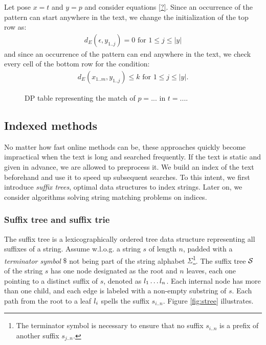 Let pose $x=t$ and $y=p$ and consider equations \ref{?}.
Since an occurrence of the pattern can start anywhere in the text, we change the initialization of the top row as:
\begin{eqnarray}
d_E(\epsilon, y_{1..j}) = 0 \text{ for } 1 \leq j \leq | y |
\end{eqnarray}
and since an occurrence of the pattern can end anywhere in the text, we check every cell of the bottom row for the condition:
\begin{eqnarray}
d_E(x_{1..m},y_{1..j}) \leq k \text{ for } 1 \leq j \leq | y |.
\end{eqnarray}

\begin{figure}[h]
\caption{DP table representing the match of $p=...$ in $t=...$.}
\label{fig:asm-dp}
\end{figure}





\subsection{Indexed methods}

No matter how fast online methods can be, these approaches quickly become impractical when the text is long and searched frequently.
If the text is static and given in advance, we are allowed to preprocess it.
We build an index of the text beforehand and use it to speed up subsequent searches.
To this intent, we first introduce \emph{suffix trees}, optimal data structures to index strings.
Later on, we consider algorithms solving string matching problems on indices.


\subsubsection{Suffix tree and suffix trie}

The suffix tree \citep{Morrison1968} is a lexicographically ordered tree data structure representing all suffixes of a string.
Assume w.l.o.g. a string $s$ of length $n$, padded with a \emph{terminator symbol} $\$$ not being part of the string alphabet $\Sigma$\footnote{The terminator symbol is necessary to ensure that no suffix $s_{i..n}$ is a prefix of another suffix $s_{j..n}$.}.
The suffix tree $\mathcal {S}$ of the string $s$ has one node designated as the root and $n$ leaves, each one pointing to a distinct suffix of $s$, denoted as $l_1 \dots l_n$.
Each internal node has more than one child, and each edge is labeled with a non-empty substring of $s$.
Each path from the root to a leaf $l_i$ spells the suffix $s_{i..n}$.
Figure \ref{fig:stree} illustrates.

